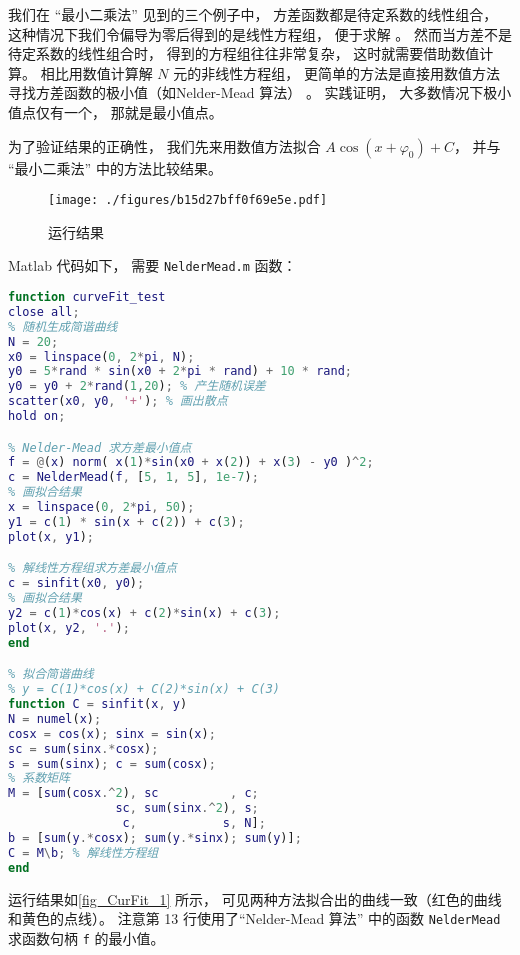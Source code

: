 
我们在 “最小二乘法” 见到的三个例子中， 方差函数都是待定系数的线性组合， 这种情况下我们令偏导为零后得到的是线性方程组， 便于求解 %
。 然而当方差不是待定系数的线性组合时， 得到的方程组往往非常复杂， 这时就需要借助数值计算。 相比用数值计算解 $N$ 元的非线性方程组， 更简单的方法是直接用数值方法寻找方差函数的极小值（如Nelder-Mead 算法） 。 实践证明， 大多数情况下极小值点仅有一个， 那就是最小值点。

为了验证结果的正确性， 我们先来用数值方法拟合 $A\cos (x + \varphi_0) + C$， 并与 “最小二乘法” 中的方法比较结果。

\begin{figure}[ht]
\centering
\texttt{[image: ./figures/b15d27bff0f69e5e.pdf]}
\caption{运行结果} \label{fig_CurFit_1}
\end{figure}

Matlab 代码如下， 需要 \verb|NelderMead.m| 函数：
\begin{lstlisting}[language=matlab, caption=curveFit\_test.m]
function curveFit_test
close all;
% 随机生成简谐曲线
N = 20;
x0 = linspace(0, 2*pi, N);
y0 = 5*rand * sin(x0 + 2*pi * rand) + 10 * rand;
y0 = y0 + 2*rand(1,20); % 产生随机误差
scatter(x0, y0, '+'); % 画出散点
hold on;

% Nelder-Mead 求方差最小值点
f = @(x) norm( x(1)*sin(x0 + x(2)) + x(3) - y0 )^2;
c = NelderMead(f, [5, 1, 5], 1e-7);
% 画拟合结果
x = linspace(0, 2*pi, 50);
y1 = c(1) * sin(x + c(2)) + c(3);
plot(x, y1);

% 解线性方程组求方差最小值点
c = sinfit(x0, y0);
% 画拟合结果
y2 = c(1)*cos(x) + c(2)*sin(x) + c(3);
plot(x, y2, '.');
end

% 拟合简谐曲线
% y = C(1)*cos(x) + C(2)*sin(x) + C(3)
function C = sinfit(x, y)
N = numel(x);
cosx = cos(x); sinx = sin(x);
sc = sum(sinx.*cosx);
s = sum(sinx); c = sum(cosx);
% 系数矩阵
M = [sum(cosx.^2), sc          , c;
               sc, sum(sinx.^2), s;
                c,            s, N];
b = [sum(y.*cosx); sum(y.*sinx); sum(y)];
C = M\b; % 解线性方程组
end
\end{lstlisting}

运行结果如\autoref{fig_CurFit_1} 所示， 可见两种方法拟合出的曲线一致（红色的曲线和黄色的点线）。 注意第 13 行使用了“Nelder-Mead 算法” 中的函数 \verb|NelderMead| 求函数句柄 \verb|f| 的最小值。


